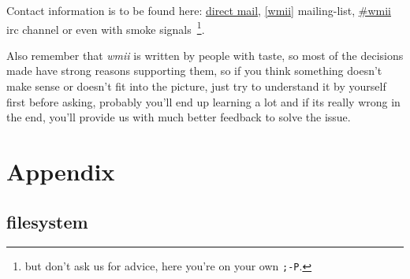 \documentclass[12pt,a4paper]{article} %
\newcommand{\wmii}{\emph{wmii}}
\begin{document}
    Contact information is to be found here:
    \href{http://suckless.org/index.php/BeginnersGuide}{direct mail},
    \href{http://suckless.org/index.php/MailingList}{[wmii]} mailing-list,
    \href{http://suckless.org/index.php/IRC}{\#wmii} irc channel or even
    with smoke signals~\footnote{ but don't ask us for advice, here
      you're on your own \texttt{;-P}.}.

    Also remember that \wmii{} is written by people with taste, so most
    of the decisions made have strong reasons supporting them, so if
    you think something doesn't make sense or doesn't fit into the
    picture, just try to understand it by yourself first before
    asking, probably you'll end up learning a lot and if its really
    wrong in the end, you'll provide us with much better feedback to
    solve the issue.

    \newpage

    \section{Appendix}
    \label{sec:appendix}

    \subsection{filesystem}
\end{document}
